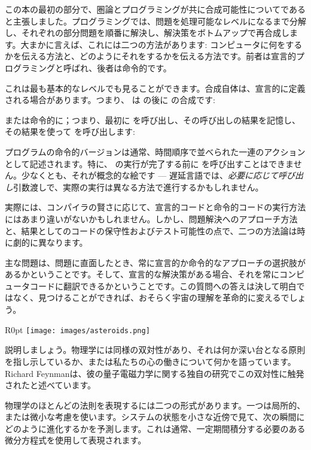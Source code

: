 
\lettrine[lhang=0.17]{こ}{の本}の最初の部分で、圏論とプログラミングが共に合成可能性についてであると主張しました。プログラミングでは、問題を処理可能なレベルになるまで分解し、それぞれの部分問題を順番に解決し、解決策をボトムアップで再合成します。大まかに言えば、これには二つの方法があります: コンピュータに何をするかを伝える方法と、どのようにそれをするかを伝える方法です。前者は宣言的プログラミングと呼ばれ、後者は命令的です。

これは最も基本的なレベルでも見ることができます。合成自体は、宣言的に定義される場合があります。つまり、 は  の後に  の合成です: 

または命令的に；つまり、最初に  を呼び出し、その呼び出しの結果を記憶し、その結果を使って  を呼び出します: 

プログラムの命令的バージョンは通常、時間順序で並べられた一連のアクションとして記述されます。特に、 の実行が完了する前に  を呼び出すことはできません。少なくとも、それが概念的な絵です --- 遅延言語では、\emph{必要に応じて呼び出し}引数渡しで、実際の実行は異なる方法で進行するかもしれません。

実際には、コンパイラの賢さに応じて、宣言的コードと命令的コードの実行方法にはあまり違いがないかもしれません。しかし、問題解決へのアプローチ方法と、結果としてのコードの保守性およびテスト可能性の点で、二つの方法論は時に劇的に異なります。

主な問題は、問題に直面したとき、常に宣言的か命令的なアプローチの選択肢があるかということです。そして、宣言的な解決策がある場合、それを常にコンピュータコードに翻訳できるかということです。この質問への答えは決して明白ではなく、見つけることができれば、おそらく宇宙の理解を革命的に変えるでしょう。

\begin{wrapfigure}{R}{0pt}
  \texttt{[image: images/asteroids.png]}
\end{wrapfigure}

説明しましょう。物理学には同様の双対性があり、それは何か深い台となる原則を指し示しているか、または私たちの心の働きについて何かを語っています。Richard Feynmanは、彼の量子電磁力学に関する独自の研究でこの双対性に触発されたと述べています。

物理学のほとんどの法則を表現するには二つの形式があります。一つは局所的、または微小な考慮を使います。システムの状態を小さな近傍で見て、次の瞬間にどのように進化するかを予測します。これは通常、一定期間積分する必要のある微分方程式を使用して表現されます。

